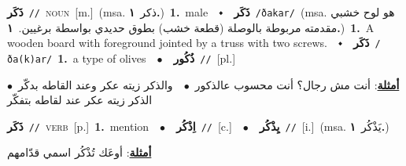 \documentclass[10pt,a4paper,twoside]{article} %
\begin{document}
\begin{multicols}{2}
{\setlength\topsep{0pt}\textbf{\foreignlanguage{arabic}{ذَكَر}}\ {\color{gray}\texttt{//}\color{black}}\ \textsc{noun}\ [m.]\ \color{gray}(msa. \foreignlanguage{arabic}{ذكر}~\foreignlanguage{arabic}{\textbf{١.}})\color{black}\ \textbf{1.}~male\ \ $\smblkdiamond$\ \ \setlength\topsep{0pt}\textbf{\foreignlanguage{arabic}{ذَكَر}}\ {\color{gray}\texttt{/ðakar/}\color{black}}\ \color{gray}(msa. \foreignlanguage{arabic}{هو لوح خشبي مقدمته مربوطة بالوصلة (قطعة خشب) بطوق حديدي بواسطة برغيين.}~\foreignlanguage{arabic}{\textbf{١.}})\color{black}\ \textbf{1.}~A wooden board with foreground jointed by a truss with two screws.\ \ $\smblkdiamond$\ \ \setlength\topsep{0pt}\textbf{\foreignlanguage{arabic}{ذَكَر}}\ {\color{gray}\texttt{/ða(k)ar/}\color{black}}\ \textbf{1.}~a type of olives\ \ $\bullet$\ \ \setlength\topsep{0pt}\textbf{\foreignlanguage{arabic}{ذُكُور}}\ {\color{gray}\texttt{//}\color{black}}\ [pl.]\  \begin{flushright}\color{gray}\foreignlanguage{arabic}{\textbf{\underline{\foreignlanguage{arabic}{أمثلة}}}: أنت مش رجال؟ أنت محسوب عالذكور\ $\bullet$\ \  والذكر زيته عكر وعند القاطه بدكّر\ $\bullet$\ \  الذكر زيته عكر عند لقاطه بتفكّر}\end{flushright}\color{black}} \vspace{2mm}

{\setlength\topsep{0pt}\textbf{\foreignlanguage{arabic}{ذَكَر}}\ {\color{gray}\texttt{//}\color{black}}\ \textsc{verb}\ [p.]\ \textbf{1.}~mention\ \ $\bullet$\ \ \setlength\topsep{0pt}\textbf{\foreignlanguage{arabic}{اِذْكُر}}\ {\color{gray}\texttt{//}\color{black}}\ [c.]\ \ $\bullet$\ \ \setlength\topsep{0pt}\textbf{\foreignlanguage{arabic}{يِذْكُر}}\ {\color{gray}\texttt{//}\color{black}}\ [i.]\ \color{gray}(msa. \foreignlanguage{arabic}{يَذْكُر}~\foreignlanguage{arabic}{\textbf{١.}})\color{black}\  \begin{flushright}\color{gray}\foreignlanguage{arabic}{\textbf{\underline{\foreignlanguage{arabic}{أمثلة}}}: أوعَك تُذْكُر اسمي قدّامهم}\end{flushright}\color{black}} \vspace{2mm}


\end{multicols}
\end{document}
